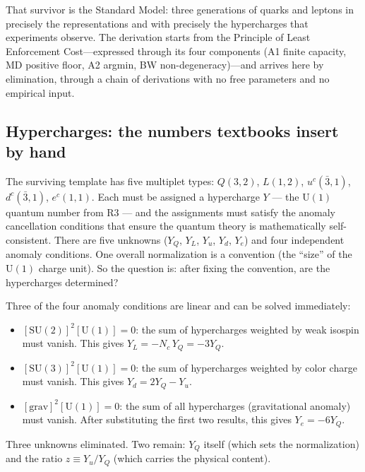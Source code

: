 \documentclass[11pt]{article}
\newenvironment{varlist}{\begin{itemize}[nosep,leftmargin=2em]}{\end{itemize}}
\newcommand{\SU}{\mathrm{SU}}
\newcommand{\U}{\mathrm{U}}
\begin{document}
That survivor is the Standard Model: three generations of quarks and leptons in precisely the representations and with precisely the hypercharges that experiments observe.  The derivation starts from the Principle of Least Enforcement Cost---expressed through its four components (A1 finite capacity, MD positive floor, A2 argmin, BW non-degeneracy)---and arrives here by elimination, through a chain of derivations with no free parameters and no empirical input.

\subsection{Hypercharges: the numbers textbooks insert by hand}

The surviving template has five multiplet types: $Q(3,2)$, $L(1,2)$, $u^c(\bar{3},1)$, $d^c(\bar{3},1)$, $e^c(1,1)$.  Each must be assigned a hypercharge $Y$ --- the $\U(1)$ quantum number from R3 --- and the assignments must satisfy the anomaly cancellation conditions that ensure the quantum theory is mathematically self-consistent.  There are five unknowns ($Y_Q$, $Y_L$, $Y_u$, $Y_d$, $Y_e$) and four independent anomaly conditions.  One overall normalization is a convention (the ``size'' of the $\U(1)$ charge unit).  So the question is: after fixing the convention, are the hypercharges determined?

Three of the four anomaly conditions are linear and can be solved immediately:

\begin{varlist}
\item $[\SU(2)]^2[\U(1)] = 0$: the sum of hypercharges weighted by weak isospin must vanish.  This gives $Y_L = -N_c \, Y_Q = -3 Y_Q$.
\item $[\SU(3)]^2[\U(1)] = 0$: the sum of hypercharges weighted by color charge must vanish.  This gives $Y_d = 2Y_Q - Y_u$.
\item $[\mathrm{grav}]^2[\U(1)] = 0$: the sum of all hypercharges (gravitational anomaly) must vanish.  After substituting the first two results, this gives $Y_e = -6 Y_Q$.
\end{varlist}

\noindent Three unknowns eliminated.  Two remain: $Y_Q$ itself (which sets the normalization) and the ratio $z \equiv Y_u / Y_Q$ (which carries the physical content).
\end{document}
